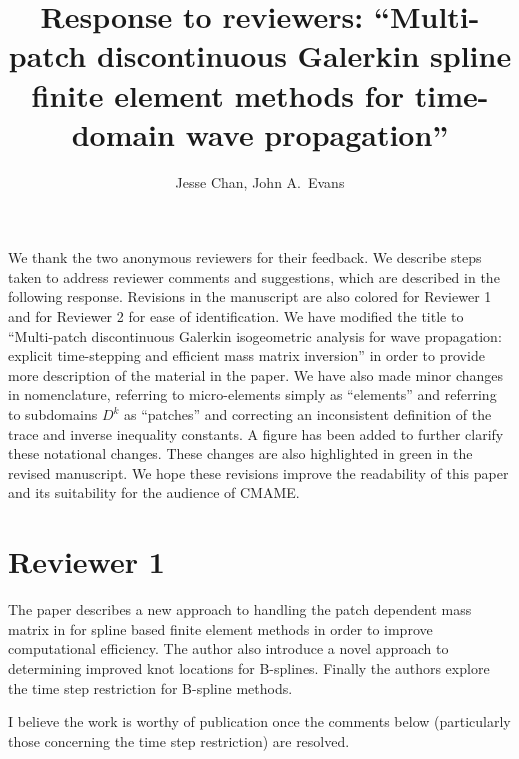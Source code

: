 \documentclass[10pt]{article}
\date{}
\author{Jesse Chan, John A.\ Evans}
\title{Response to reviewers: ``Multi-patch discontinuous Galerkin spline finite element methods for time-domain wave propagation''}
\newcommand{\note}[1]{{\color{violet}#1}}
\newcommand{\reviewerOne}[1]{{\color{blue}#1}}
\newcommand{\reviewerTwo}[1]{{\color{red}#1}}
\begin{document}
\maketitle

\note{We thank the two anonymous reviewers for their feedback.  We describe steps taken to address reviewer comments and suggestions, which are described in the following response.  Revisions in the manuscript are also colored \reviewerOne{for Reviewer 1} and \reviewerTwo{for Reviewer 2} for ease of identification.  We have modified the title to ``Multi-patch discontinuous Galerkin isogeometric analysis for wave propagation: explicit time-stepping and efficient mass matrix inversion'' in order to provide more description of the material in the paper.  We have also made minor changes in nomenclature, referring to micro-elements simply as ``elements'' and referring to subdomains $D^k$ as ``patches'' and correcting an inconsistent definition of the trace and inverse inequality constants.  A figure has been added to further clarify these notational changes.  These changes are also highlighted in {\color{forestgreen} green} in the revised manuscript.   We hope these revisions improve the readability of this paper and its suitability for the audience of CMAME.}  

\section{Reviewer 1}

The paper describes a new approach to handling the patch dependent mass matrix in for spline based finite element methods in order to improve computational efficiency. The author also introduce a novel approach to determining improved knot locations for B-splines. Finally the authors explore the time step restriction for B-spline methods.

I believe the work is worthy of publication once the comments below (particularly those concerning the time step restriction) are resolved.
\end{document}
